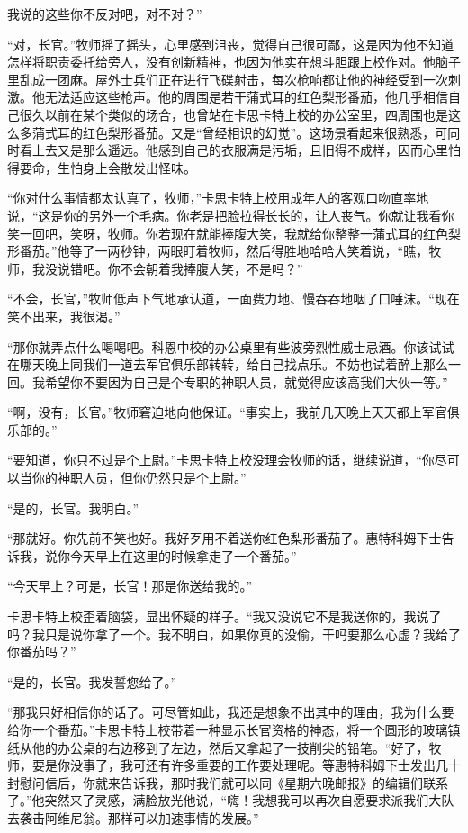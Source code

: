     我说的这些你不反对吧，对不对？”

    “对，长官。”牧师摇了摇头，心里感到沮丧，觉得自己很可鄙，这是因为他不知道怎样将职责委托给旁人，没有创新精神，也因为他实在想斗胆跟上校作对。他脑子里乱成一团麻。屋外士兵们正在进行飞碟射击，每次枪响都让他的神经受到一次刺激。他无法适应这些枪声。他的周围是若干蒲式耳的红色梨形番茄，他几乎相信自己很久以前在某个类似的场合，也曾站在卡思卡特上校的办公室里，四周围也是这么多蒲式耳的红色梨形番茄。又是“曾经相识的幻觉”。这场景看起来很熟悉，可同时看上去又是那么遥远。他感到自己的衣服满是污垢，且旧得不成样，因而心里怕得要命，生怕身上会散发出怪味。

    “你对什么事情都太认真了，牧师，”卡思卡特上校用成年人的客观口吻直率地说，“这是你的另外一个毛病。你老是把脸拉得长长的，让人丧气。你就让我看你笑一回吧，笑呀，牧师。你若现在就能捧腹大笑，我就给你整整一蒲式耳的红色梨形番茄。”他等了一两秒钟，两眼盯着牧师，然后得胜地哈哈大笑着说，“瞧，牧师，我没说错吧。你不会朝着我捧腹大笑，不是吗？”

    “不会，长官，”牧师低声下气地承认道，一面费力地、慢吞吞地咽了口唾沫。“现在笑不出来，我很渴。”

    “那你就弄点什么喝喝吧。科恩中校的办公桌里有些波旁烈性威士忌酒。你该试试在哪天晚上同我们一道去军官俱乐部转转，给自己找点乐。不妨也试着醉上那么一回。我希望你不要因为自己是个专职的神职人员，就觉得应该高我们大伙一等。”

    “啊，没有，长官。”牧师窘迫地向他保证。“事实上，我前几天晚上天天都上军官俱乐部的。”

    “要知道，你只不过是个上尉。”卡思卡特上校没理会牧师的话，继续说道，“你尽可以当你的神职人员，但你仍然只是个上尉。”

    “是的，长官。我明白。”

    “那就好。你先前不笑也好。我好歹用不着送你红色梨形番茄了。惠特科姆下士告诉我，说你今天早上在这里的时候拿走了一个番茄。”

    “今天早上？可是，长官！那是你送给我的。”

    卡思卡特上校歪着脑袋，显出怀疑的样子。“我又没说它不是我送你的，我说了吗？我只是说你拿了一个。我不明白，如果你真的没偷，干吗要那么心虚？我给了你番茄吗？”

    “是的，长官。我发誓您给了。”

    “那我只好相信你的话了。可尽管如此，我还是想象不出其中的理由，我为什么要给你一个番茄。”卡思卡特上校带着一种显示长官资格的神态，将一个圆形的玻璃镇纸从他的办公桌的右边移到了左边，然后又拿起了一技削尖的铅笔。“好了，牧师，要是你没事了，我可还有许多重要的工作要处理呢。等惠特科姆下士发出几十封慰问信后，你就来告诉我，那时我们就可以同《星期六晚邮报》的编辑们联系了。”他突然来了灵感，满脸放光他说，“嗨！我想我可以再次自愿要求派我们大队去袭击阿维尼翁。那样可以加速事情的发展。”

